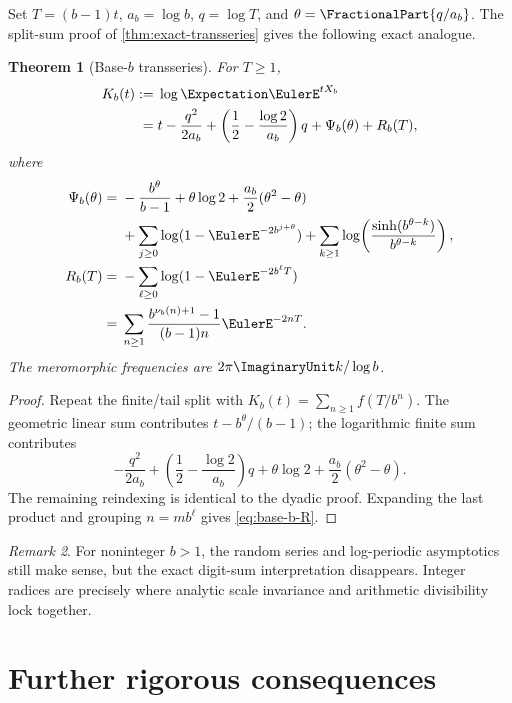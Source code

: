 \documentclass[11pt,oneside]{article}
\newtheorem{theorem}{Theorem}[section]
\theoremstyle{definition}
\theoremstyle{remark}
\newtheorem{remark}[theorem]{Remark}
\begin{document}
Set \(T=(b-1)t\), \(a_b=\log b\), \(q=\log T\), and
\(\theta=\FractionalPart{q/a_b}\).  The split-sum proof of
\cref{thm:exact-transseries} gives the following exact analogue.

\begin{theorem}[Base-\(b\) transseries]
\label{thm:base-b-transseries}
For \(T\geq1\),
\begin{align}
 K_b(t)
 :={}&\log\Expectation\EulerE^{tX_b}
 \notag\\
 ={}&
 t-\frac{q^2}{2a_b}
 +\left(\frac12-\frac{\log2}{a_b}\right)q
 +\Psi_b(\theta)+R_b(T),
 \label{eq:base-b-K}
\end{align}
where
\begin{align}
 \Psi_b(\theta)
 ={}&
 -\frac{b^\theta}{b-1}
 +\theta\log2+\frac{a_b}{2}(\theta^2-\theta)
 \notag\\
 &+\sum_{j\geq0}\log(1-\EulerE^{-2b^{j+\theta}})
 +\sum_{k\geq1}
   \log\!\left(\frac{\sinh(b^{\theta-k})}{b^{\theta-k}}\right),
 \label{eq:base-b-Psi}\\
 R_b(T)
 ={}&
 -\sum_{\ell\geq0}\log(1-\EulerE^{-2b^\ell T})
 \notag\\
 ={}&
 \sum_{n\geq1}
 \frac{b^{\nu_b(n)+1}-1}{(b-1)n}\EulerE^{-2nT}.
 \label{eq:base-b-R}
\end{align}
The meromorphic frequencies are
\(2\pi\ImaginaryUnit k/\log b\).
\end{theorem}

\begin{proof}
Repeat the finite/tail split with
\(K_b(t)=\sum_{n\geq1}f(T/b^n)\).  The geometric linear sum contributes
\(t-b^\theta/(b-1)\); the logarithmic finite sum contributes
\[
 -\frac{q^2}{2a_b}
 +\left(\frac12-\frac{\log2}{a_b}\right)q
 +\theta\log2+\frac{a_b}{2}(\theta^2-\theta).
\]
The remaining reindexing is identical to the dyadic proof.  Expanding the
last product and grouping \(n=mb^\ell\) gives \eqref{eq:base-b-R}.
\end{proof}

\begin{remark}
For noninteger \(b>1\), the random series and log-periodic asymptotics still
make sense, but the exact digit-sum interpretation disappears.  Integer
radices are precisely where analytic scale invariance and arithmetic
divisibility lock together.
\end{remark}

\section{Further rigorous consequences}
\end{document}
